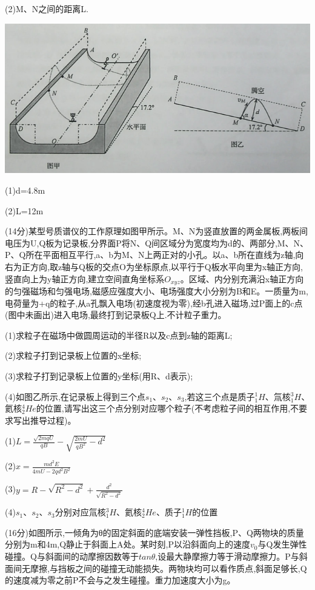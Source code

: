 (2)M、N之间的距离L.\begin{center}\includegraphics[]{img/image14.png}\end{center}
\begin{solution}{4cm}
    (1)d=4.8m

    (2)L=12m
\end{solution}
\newpage
\question[6] (14分)某型号质谱仪的工作原理如图甲所示。M、N为竖直放置的两金属板,两板间电压为U,Q板为记录板,分界面P将N、Q间区域分为宽度均为d的\uppercase\expandafter{}、\uppercase\expandafter{}两部分,M、N、P、Q所在平面相互平行,a、b为M、N上两正对的小孔。以a、b所在直线为z轴,向右为正方向,取z轴与Q板的交点O为坐标原点,以平行于Q板水平向里为x轴正方向,竖直向上为y轴正方向,建立空间直角坐标系$O_{xyz}$。区域\uppercase\expandafter{}、\uppercase\expandafter{}内分别充满沿x轴正方向的匀强磁场和匀强电场,磁感应强度大小、电场强度大小分别为B和E。一质量为m,电荷量为+q的粒子,从a孔飘入电场(初速度视为零),经b孔进入磁场,过P面上的c点(图中未画出)进入电场,最终打到记录板Q上.不计粒子重力。

(1)求粒子在磁场中做圆周运动的半径R以及c点到z轴的距离L;

(2)求粒子打到记录板上位置的x坐标;

(3)求粒子打到记录板上位置的y坐标(用R、d表示);

(4)如图乙所示,在记录板上得到三个点$s_1$、$s_2$、$s_3$,若这三个点是质子$_1^1H$、氚核$_1^3H$、氦核$_2^4He$的位置,请写出这三个点分别对应哪个粒子(不考虑粒子间的相互作用,不要求写出推导过程)。
\begin{solution}{4cm}
    (1)$L=\frac{\sqrt{2mqU}}{qB}-\sqrt{\frac{2mU}{qB^2}-d^2}$

    (2)$x=\frac{md^2E}{4mU-2qd^2B^2}$

    (3)$y=R-\sqrt{R^2-d^2}+\frac{d^2}{\sqrt{R^2-d^2}}$

    (4)$s_1$、$s_2$、$s_3$分别对应氚核$_1^3H$、氦核$_2^4He$、质子$_1^1H$的位置
\end{solution}
\newpage
\question[6] (16分)如图所示,一倾角为θ的固定斜面的底端安装一弹性挡板,P、Q两物块的质量分别为m和4m,Q静止于斜面上A处。某时刻,P以沿斜面向上的速度$v_0$与Q发生弹性碰撞。Q与斜面间的动摩擦因数等于$tanθ$,设最大静摩擦力等于滑动摩擦力。P与斜面间无摩擦,与挡板之间的碰撞无动能损失。两物块均可以看作质点,斜面足够长,Q的速度减为零之前P不会与之发生碰撞。重力加速度大小为g。

